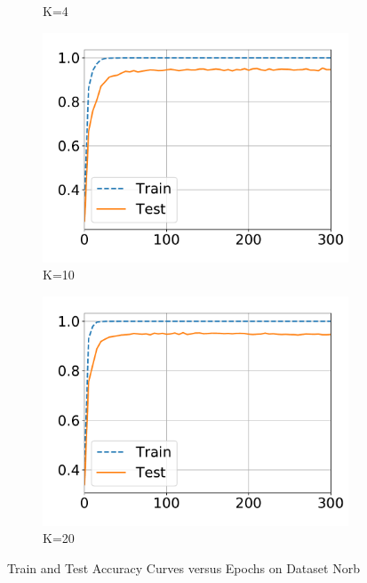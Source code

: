 \begin{figure}[!ht]
\begin{subfigure}{0.33\textwidth}
    \caption{K=4}
  \end{subfigure}
  \centering
  \begin{subfigure}{.33\textwidth}
    \centering
    \includegraphics[width=1\linewidth]{images/supply/train_curves/norb_10.pdf}
    \vspace{-0.8cm}
    \caption{K=10}
  \end{subfigure}
  \centering
  \begin{subfigure}{.33\textwidth}
    \centering
    \includegraphics[width=1\linewidth]{images/supply/train_curves/norb_20.pdf}
    \vspace{-0.8cm}
    \caption{K=20}
  \end{subfigure}
  \vspace{-0.3cm}
  \caption{Train and Test Accuracy Curves versus Epochs on Dataset Norb}
  \label{fig:class-norb}
\end{figure}


